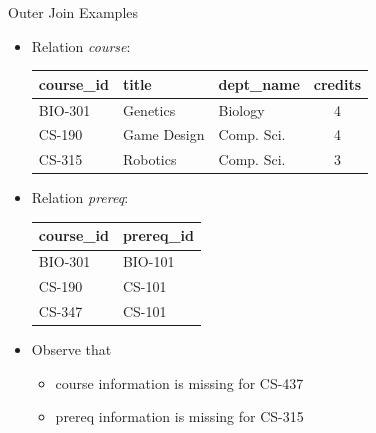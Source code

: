 \documentclass{beamer}
\begin{document}
\begin{frame}{Outer Join Examples}
    \begin{itemize}
        \item Relation \textit{course}: \\
            \vspace{2mm}
            \begin{tabular}{| l | l | l | c |}
                \hline
                \textbf{course\_id} & \textbf{title} & \textbf{dept\_name} & \textbf{credits} \\
                \hline
                BIO-301 & Genetics    & Biology    & 4 \\
                \hline
                CS-190  & Game Design & Comp. Sci. & 4 \\
                \hline
                CS-315  & Robotics    & Comp. Sci. & 3 \\
                \hline
            \end{tabular}
        \item Relation \textit{prereq}: \\
            \vspace{2mm}
            \begin{tabular}{| l | l |}
                \hline
                \textbf{course\_id} & \textbf{prereq\_id} \\
                \hline
                BIO-301 & BIO-101 \\
                \hline
                CS-190  & CS-101  \\
                \hline
                CS-347  & CS-101  \\
                \hline
            \end{tabular}
            \vspace{1mm}
        \item Observe that
        \begin{itemize}
            \item course information is missing for CS-437
            \item prereq information is missing for CS-315
        \end{itemize}
    \end{itemize}
\end{frame}
\end{document}
